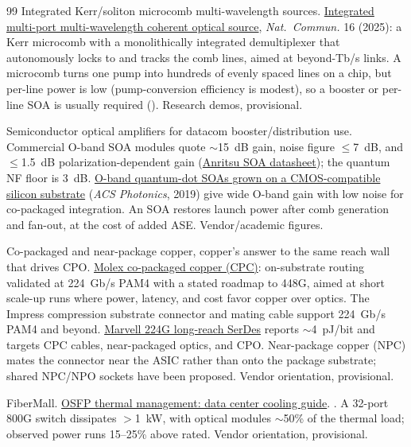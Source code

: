\begin{thebibliography}{99}
Integrated Kerr/soliton microcomb multi-wavelength sources.
\newblock \href{https://doi.org/10.1038/s41467-025-61288-x}{Integrated multi-port multi-wavelength coherent optical source}, \emph{Nat.\ Commun.} 16 (2025): a Kerr microcomb with a monolithically integrated demultiplexer that autonomously locks to and tracks the comb lines, aimed at beyond-Tb/s links.
\newblock A microcomb turns one pump into hundreds of evenly spaced lines on a chip, but per-line power is low (pump-conversion efficiency is modest), so a booster or per-line SOA is usually required (). Research demos, provisional.

Semiconductor optical amplifiers for datacom booster/distribution use.
\newblock Commercial O-band SOA modules quote $\sim$15~dB gain, noise figure $\le$7~dB, and $\le$1.5~dB polarization-dependent gain (\href{https://www.anritsu.com/en-US/sensing-devices/products/soa}{Anritsu SOA datasheet}); the quantum NF floor is 3~dB. \href{https://pubs.acs.org/doi/10.1021/acsphotonics.9b00903}{O-band quantum-dot SOAs grown on a CMOS-compatible silicon substrate} (\emph{ACS Photonics}, 2019) give wide O-band gain with low noise for co-packaged integration.
\newblock An SOA restores launch power after comb generation and fan-out, at the cost of added ASE. Vendor/academic figures.

Co-packaged and near-package copper, copper's answer to the same reach wall that drives CPO.
\newblock \href{https://www.molex.com/content/molex/molex-dot-com/language-masters/en/industries-applications/data-center-connector-solutions/near-asic/co-packaged-copper.html}{Molex co-packaged copper (CPC)}: on-substrate routing validated at 224~Gb/s PAM4 with a stated roadmap to 448G, aimed at short scale-up runs where power, latency, and cost favor copper over optics. The Impress compression substrate connector and mating cable support 224~Gb/s PAM4 and beyond.
\newblock \href{https://www.marvell.com/blogs/224g-long-range-serdes-scale-up-scale-inside.html}{Marvell 224G long-reach SerDes} reports $\sim$4~pJ/bit and targets CPC cables, near-packaged optics, and CPO. Near-package copper (NPC) mates the connector near the ASIC rather than onto the package substrate; shared NPC/NPO sockets have been proposed. Vendor orientation, provisional.

FiberMall.
\newblock \href{https://www.fibermall.com/blog/osfp-thermal-management-guide.htm}{OSFP thermal management: data center cooling guide}.
.
\newblock A 32-port 800G switch dissipates $>$1~kW, with optical modules $\sim$50\% of the thermal load; observed power runs 15--25\% above rated. Vendor orientation, provisional.


\end{thebibliography}
